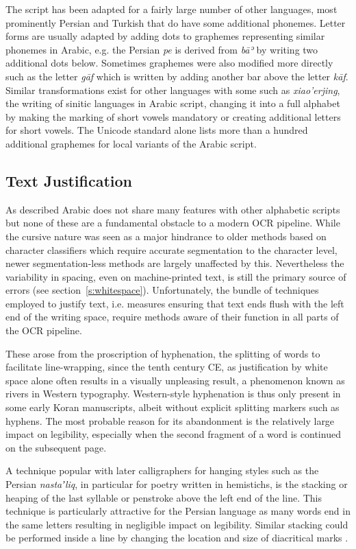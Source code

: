 The script has been adapted for a fairly large number of other languages, most
prominently Persian and Turkish that do have some additional phonemes. Letter
forms are usually adapted by adding dots to graphemes representing similar
phonemes in Arabic, e.g. the Persian \emph{pe} is derived from \emph{bāʾ} by
writing two additional dots below. Sometimes graphemes were also modified more
directly such as the letter \emph{gāf} which is written by adding another bar
above the letter \emph{kāf}. Similar transformations exist for other languages
with some such as \emph{xiao'erjing}, the writing of sinitic languages in
Arabic script, changing it into a full alphabet by making the marking of short
vowels mandatory or creating additional letters for short vowels. The Unicode
standard alone lists more than a hundred additional graphemes for local
variants of the Arabic script.

\subsection{Text Justification}

As described Arabic does not share many features with other alphabetic scripts
but none of these are a fundamental obstacle to a modern OCR pipeline.  While
the cursive nature was seen as a major hindrance to older methods based on
character classifiers which require accurate segmentation to the character
level, newer segmentation-less methods are largely unaffected by this.
Nevertheless the variability in spacing, even on machine-printed text, is still
the primary source of errors (see section~\ref{s:whitespace}). Unfortunately,
the bundle of techniques employed to justify text, i.e. measures ensuring that
text ends flush with the left end of the writing space, require methods aware
of their function in all parts of the OCR pipeline.

These arose from the proscription of hyphenation, the splitting of words to
facilitate line-wrapping, since the tenth century CE, as justification by
white space alone often results in a visually unpleasing result, a phenomenon
known as rivers in Western typography. Western-style hyphenation is thus only
present in some early Koran manuscripts, albeit without explicit splitting
markers such as hyphens. The most probable reason for its abandonment is the
relatively large impact on legibility, especially when the second fragment of a
word is continued on the subsequent page.

A technique popular with later calligraphers for hanging styles such as the
Persian \emph{nastaʼliq}, in particular for poetry written in hemistichs, is
the stacking or heaping of the last syllable or penstroke above the left end of
the line. This technique is particularly attractive for the Persian language
as many words end in the same letters resulting in negligible impact on
legibility. Similar stacking could be performed inside a line by changing the
location and size of diacritical marks \cite[pg. 14]{blair2006islamic}.

